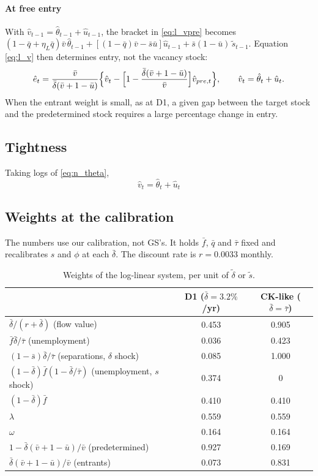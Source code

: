 \documentclass[authoryear, review, 12pt]{elsarticle}
\begin{document}
\paragraph{At free entry}
With $\hat v_{t-1}=\hat\theta_{t-1}+\hat u_{t-1}$, the bracket in \eqref{eq:l_vpre}
becomes $(1-\bar q+\eta_L\bar q)\bar v\,\hat\theta_{t-1}+[(1-\bar q)\bar v-\bar s\bar u]\hat u_{t-1}
+\bar s(1-\bar u)\,\tilde s_{t-1}$.
Equation \eqref{eq:l_v} then determines entry, not the vacancy stock:
\[
	\hat e_t=\frac{\bar v}{\bar\delta(\bar v+1-\bar u)}
	\Bigl\{\hat v_t-\Bigl[1-\frac{\bar\delta(\bar v+1-\bar u)}{\bar v}\Bigr]\hat v_{pre,t}\Bigr\},
	\qquad \hat v_t=\hat\theta_t+\hat u_t .
\]
When the entrant weight is small, as at D1, a given gap between the target stock and the
predetermined stock requires a large percentage change in entry.

\subsection{Tightness}

Taking logs of \eqref{eq:n_theta},
\begin{equation}\label{eq:l_theta}
	\boxed{\;\hat v_t=\hat\theta_t+\hat u_t\;}
\end{equation}

\subsection{Weights at the calibration}

The numbers use our calibration, not GS's. It holds $\bar f$, $\bar q$ and $\bar\tau$ fixed
and recalibrates $s$ and $\phi$ at each $\bar\delta$. The discount rate is $r=0.0033$
monthly.

\begin{table}[h]
\centering
\begin{tabular}{lcc}
\toprule
 & D1 ($\bar\delta=3.2\%$/yr) & CK-like ($\bar\delta=\bar\tau$) \\
\midrule
$\bar\delta/(r+\bar\delta)$ (flow value) & 0.453 & 0.905 \\
$\bar f\bar\delta/\bar\tau$ (unemployment) & 0.036 & 0.423 \\
$(1-\bar s)\bar\delta/\bar\tau$ (separations, $\delta$ shock) & 0.085 & 1.000 \\
$(1-\bar\delta)\bar f(1-\bar\delta/\bar\tau)$ (unemployment, $s$ shock) & 0.374 & 0 \\
$(1-\bar\delta)\bar f$ & 0.410 & 0.410 \\
$\lambda$ & 0.559 & 0.559 \\
$\omega$ & 0.164 & 0.164 \\
$1-\bar\delta(\bar v+1-\bar u)/\bar v$ (predetermined) & 0.927 & 0.169 \\
$\bar\delta(\bar v+1-\bar u)/\bar v$ (entrants) & 0.073 & 0.831 \\
\bottomrule
\end{tabular}
\caption{Weights of the log-linear system, per unit of $\tilde\delta$ or $\tilde s$.}
\label{tab:weights}
\end{table}
\end{document}
